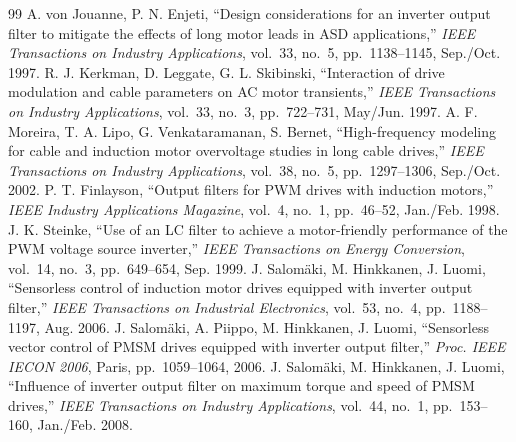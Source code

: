\documentclass[10pt,a4paper]{scrartcl}
\begin{document}
\begin{thebibliography}{99}
 A. von Jouanne, P. N. Enjeti, ``Design considerations for an inverter output filter to mitigate the effects of long motor leads in ASD applications,'' \emph{IEEE Transactions on Industry Applications}, vol.~33, no.~5, pp.~1138--1145, Sep./Oct. 1997.
 R. J. Kerkman, D. Leggate, G. L. Skibinski, ``Interaction of drive modulation and cable parameters on AC motor transients,'' \emph{IEEE Transactions on Industry Applications}, vol.~33, no.~3, pp.~722--731, May/Jun. 1997.
 A. F. Moreira, T. A. Lipo, G. Venkataramanan, S. Bernet, ``High-frequency modeling for cable and induction motor overvoltage studies in long cable drives,'' \emph{IEEE Transactions on Industry Applications}, vol.~38, no.~5, pp.~1297--1306, Sep./Oct. 2002.
 P. T. Finlayson, ``Output filters for PWM drives with induction motors,'' \emph{IEEE Industry Applications Magazine}, vol.~4, no.~1, pp.~46--52, Jan./Feb. 1998.
 J. K. Steinke, ``Use of an LC filter to achieve a motor-friendly performance of the PWM voltage source inverter,'' \emph{IEEE Transactions on Energy Conversion}, vol.~14, no.~3, pp.~649--654, Sep. 1999.
 J. Salom\"aki, M. Hinkkanen, J. Luomi, ``Sensorless control of induction motor drives equipped with inverter output filter,'' \emph{IEEE Transactions on Industrial Electronics}, vol.~53, no.~4, pp.~1188--1197, Aug. 2006.
 J. Salom\"aki, A. Piippo, M. Hinkkanen, J. Luomi, ``Sensorless vector control of PMSM drives equipped with inverter output filter,'' \emph{Proc. IEEE IECON 2006}, Paris, pp.~1059--1064, 2006.
 J. Salom\"aki, M. Hinkkanen, J. Luomi, ``Influence of inverter output filter on maximum torque and speed of PMSM drives,'' \emph{IEEE Transactions on Industry Applications}, vol.~44, no.~1, pp.~153--160, Jan./Feb. 2008.
\end{thebibliography}
\end{document}

